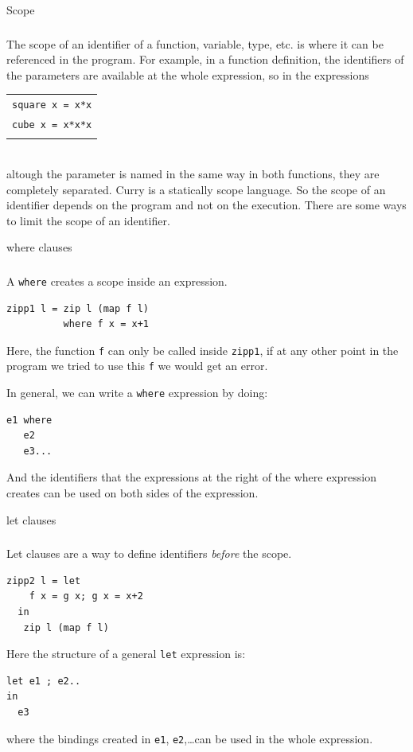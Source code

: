 \documentclass{beamer}
\newcommand{\q}[1]{\texttt{#1}}
\begin{document}
\begin{section}{Scope}
  \begin{frame}
\frametitle{\secname}
  The scope of an identifier of a function, variable, type, etc. is where it can be referenced in the program.
  For example, in a function definition, the identifiers of the parameters are available at the whole expression, so in the expressions

  \begin{tabular}[c]{l}
    \\
    \q{square x = x*x}\\
    \q{cube x = x*x*x}\\
    \\
    
  \end{tabular}\\

  
  altough the parameter is named in the same way in both functions, they are completely separated. Curry is a statically scope language. So the scope of an identifier depends on the program and not on the execution. There are some ways to limit the scope of an identifier.
\end{frame}
\begin{subsection}{where clauses}
\begin{frame}
[fragile]
\frametitle{\subsecname}
    A \q{where} creates a scope inside an expression.
\begin{verbatim}
zipp1 l = zip l (map f l)
          where f x = x+1
\end{verbatim}

    Here, the function \q{f} can only be called inside \q{zipp1}, if at any other point in the program we tried to use this \q{f} we would get an error.

    In general, we can write a \q{where} expression  by doing:
\begin{verbatim}
e1 where
   e2
   e3...
\end{verbatim}
    And the identifiers that the expressions at the right of the where expression creates can be used on both sides of the expression.
\end{frame}
\end{subsection}
\begin{subsection}{let clauses}
  \begin{frame}
[fragile]
\frametitle{\subsecname}

Let clauses are a way to define identifiers \textit{before} the scope.

\begin{verbatim}
zipp2 l = let
    f x = g x; g x = x+2
  in
   zip l (map f l)
\end{verbatim}
    Here the structure of a general \q{let} expression is:
    
\begin{verbatim}
let e1 ; e2..
in
  e3
\end{verbatim}
    where the bindings created in \q{e1}, \q{e2},\ldots can be used in the whole expression.
\end{frame}
\end{subsection}
  
\end{section}
\end{document}
